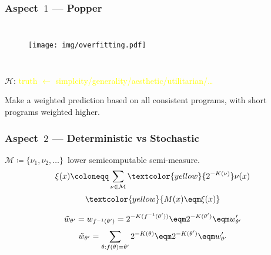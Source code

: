 \documentclass[UTF8,11pt,colorlinks,compress,openany]{beamer}%
\begin{document}
\begin{frame}\frametitle{Aspect~$1$ --- Popper}
	\begin{columns}
			\begin{figure}
				\texttt{[image: img/overfitting.pdf]}
			\end{figure}
	\end{columns}
	\begin{center}
		$\mathcal{H}$: \textcolor{yellow}{truth $\gets$ simplcity/generality/aesthetic/utilitarian/\dots}
	\end{center}
	Make a weighted prediction based on all consistent programs, with short programs weighted higher.
\end{frame}

\begin{frame}\frametitle{Aspect~$2$ --- Deterministic vs Stochastic}
	$\mathcal{M}\coloneqq \{\nu_1,\nu_2,\dots\}$~lower semicomputable semi-measure.
	\[
	\xi(x)\coloneqq \sum\limits_{\nu\in\mathcal{M}}\textcolor{yellow}{2^{-K(\nu)}}\nu(x)\]
	\[\textcolor{yellow}{M(x)\eqm \xi(x)}\]
	\begin{center}
	\end{center}
	\[\tilde{w}_{\theta'} = w_{f^{-1}(\theta')} =
2^{-K(f^{-1}(\theta'))} \eqm 2^{-K(\theta')}\eqm w_{\theta'}'\]
	\[\tilde{w}_{\theta'} = \sum\limits_{\theta:f(\theta)=\theta'}2^{-K(\theta)}\eqm 2^{-K(\theta')}\eqm w_{\theta'}'\]
\end{frame}
\end{document}
